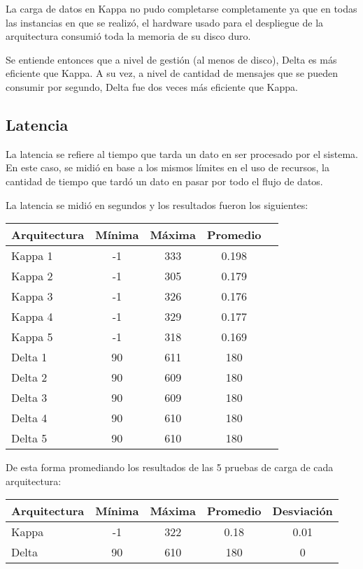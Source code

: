 La carga de datos en Kappa no pudo completarse completamente ya que en todas las instancias en que se realizó, 
el hardware usado para el despliegue de la arquitectura consumió toda la memoria de su disco duro.  

Se entiende entonces que a nivel de gestión (al menos de disco), Delta es más eficiente que Kappa.
A su vez, a nivel de cantidad de mensajes que se pueden consumir por segundo, Delta fue dos veces más eficiente que Kappa.

\newpage

\subsection{Latencia}

La latencia se refiere al tiempo que tarda un dato en ser procesado por el sistema.
En este caso, se midió en base a los mismos límites en el uso de recursos, la cantidad de tiempo que tardó un dato en pasar por todo el flujo de datos.

La latencia se midió en segundos y los resultados fueron los siguientes:

\begin{longtable}{|p{3cm}|c|c|c|c|}
    \hline
    \textbf{Arquitectura} & \textbf{Mínima} & \textbf{Máxima} & \textbf{Promedio} \\
    \hline
    Kappa 1 & -1 & 333 & 0.198 \\
    \hline
    Kappa 2 & -1 & 305 & 0.179 \\
    \hline
    Kappa 3 & -1 & 326 & 0.176 \\
    \hline
    Kappa 4 & -1 & 329 & 0.177 \\
    \hline
    Kappa 5 & -1 & 318 & 0.169 \\
    \hline
    Delta 1 & 90 & 611 & 180 \\
    \hline
    Delta 2 & 90 & 609 & 180 \\
    \hline
    Delta 3 & 90 & 609 & 180 \\
    \hline
    Delta 4 & 90 & 610 & 180 \\
    \hline
    Delta 5 & 90 & 610 & 180 \\
    \hline
\end{longtable}

De esta forma promediando los resultados de las 5 pruebas de carga de cada arquitectura: 

\begin{longtable}{|p{3cm}|c|c|c|c|}
    \hline
    \textbf{Arquitectura} & \textbf{Mínima} & \textbf{Máxima} & \textbf{Promedio}  & \textbf{Desviación} \\
    \hline
    Kappa & -1 & 322 & 0.18 & 0.01\\
    \hline
    Delta & 90 & 610 & 180 & 0\\
    \hline
\end{longtable}

